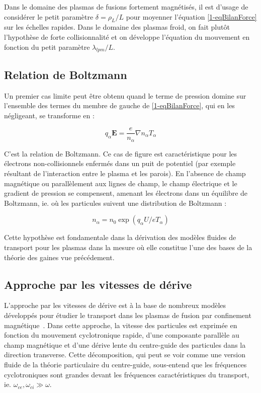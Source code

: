 \begin{refsection}
Dans le domaine des plasmas de fusions fortement magnétisés, il est d'usage de
considérer le petit paramètre $\delta=\rho_L/L$ pour moyenner l'équation
\eqref{1-eqBilanForce} sur les échelles rapides. Dans le domaine des plasmas
froid, on fait plutôt l'hypothèse de forte collisionnalité et on développe
l'équation du mouvement en fonction du petit paramètre $\lambda_{lpm}/L$.

\subsection{Relation de Boltzmann}  
Un premier cas limite peut être obtenu quand le terme de pression domine
sur l'ensemble des termes du membre de gauche de \eqref{1-eqBilanForce}, qui en
les négligeant, se transforme en :

\begin{equation}
\label{1-equilibreBoltzman}
q_\alpha\mathbf
E =\frac{e}{n_\alpha}\nabla n_\alpha T_\alpha
\end{equation}

C'est la relation de Boltzmann. Ce cas de figure est caractéristique pour les
électrons non-collisionnels enfermés dans un puit de potentiel (par exemple résultant de
l'interaction entre le plasma et les parois). En l'absence de champ magnétique
ou parallèlement aux lignes de champ, le champ électrique et le gradient de
pression se compensent, amenant les électrons dans un équilibre de Boltzmann,
ie. où les particules suivent une distribution de Boltzmann :

\begin{equation}
\label{1-profilBoltzman}
n_\alpha=n_0\exp(q_\alpha U/eT_\alpha)
\end{equation}

Cette hypothèse est fondamentale dans la dérivation des modèles fluides de
transport pour les plasmas dans la mesure où elle constitue l'une des bases de
la théorie des gaines vue précédement. 

\subsection{Approche par les vitesses de dérive}
\label{vitessesDerive}
L'approche par les vitesses de dérive est à la base de nombreux modèles
développés pour étudier le transport dans les plasmas de fusion par
confinement magnétique~\parencite{Garcia,Bisai,Tamain}. Dans cette approche, la
vitesse des particules est exprimée en fonction du mouvement cyclotronique rapide, d'une composante
parallèle au champ magnétique et d'une dérive lente du centre-guide des particules dans
la direction transverse. Cette décomposition, qui peut se voir comme une
version fluide de la théorie particulaire du centre-guide, sous-entend que les
fréquences cyclotroniques sont grandes devant les fréquences caractéristiques du
transport, ie. $\omega_{ce},\omega_{ci}\gg\omega$. 
 

\end{refsection}
